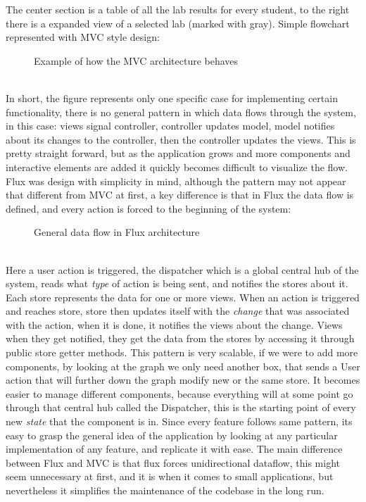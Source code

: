 The center section is a table of all the lab results for every student, to the right there is a expanded view of a selected lab (marked with gray).
Simple flowchart represented with MVC style design:
\begin{figure}[h]
\centering
\scalebox{0.9}{}
\caption{Example of how the MVC architecture behaves}
\end{figure}
\\In short, the figure represents only one specific case for implementing certain functionality, there is no general pattern in which data flows through the system, in this case: views signal controller, controller updates model, model notifies about its changes to the controller, then the controller updates the views. This is pretty straight forward, but as the application grows and more components and interactive elements are added it quickly becomes difficult to visualize the flow.
\\Flux was design with simplicity in mind, although the pattern may not appear that different from MVC at first, a key difference is that in Flux the data flow is defined, and every action is forced to the beginning of the system:
\begin{figure}[h]
\centering
\scalebox{0.8}{{}}
\caption{General data flow in Flux architecture}
\end{figure}
\\Here a user action is triggered, the dispatcher which is a global central hub of the system, reads what \emph{type} of action is being sent, and notifies the stores about it. Each store represents the data for one or more views. When an action is triggered and reaches store, store then updates itself with the \emph{change} that was associated with the action, when it is done, it notifies the views about the change. Views when they get notified, they get the data from the stores by accessing it through public store getter methods.
This pattern is very scalable, if we were to add more components, by looking at the graph we only need another box, that sends a User action that will further down the graph modify new or the same store. It becomes easier to manage different components, because everything will at some point go through that central hub called the Dispatcher, this is the starting point of every new \emph{state} that the component is in. Since every feature follows same pattern, its easy to grasp the general idea of the application by looking at any particular implementation of any feature, and replicate it with ease. The main difference between Flux and MVC is that flux forces unidirectional dataflow, this might seem unnecessary at first, and it is when it comes to small applications, but nevertheless it simplifies the maintenance of the codebase in the long run.

